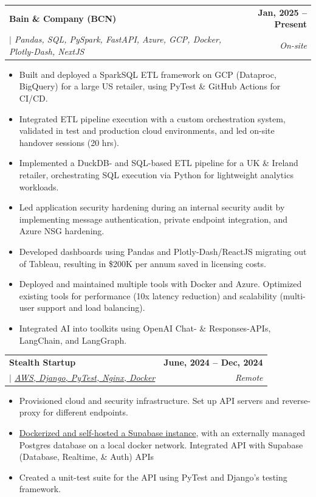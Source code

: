 \documentclass[letterpaper,11pt]{article}
\makeatletter
\newcommand{\uniformunderline}[1]{%
  \uline{\phantom{#1}}%
  \llap{\contour{white}{#1}}%
}
\newcommand{\resumeItem}[1]{
  \item\small{
    {#1 \vspace{-1pt}}
  }
}
\newcommand{\resumeSubheading}[4]{
  \vspace{-1pt}\item
    \begin{tabular*}{1.0\textwidth}[t]{l@{\extracolsep{\fill}}r}
      \textbf{\large#1} & \textbf{\small #2} \\
      \textit{\large#3} & \textit{\small #4} \\
      
    \end{tabular*}\vspace{-7pt}
}
\newcommand{\resumeItemListStart}{\begin{itemize}}
\newcommand{\resumeItemListEnd}{\end{itemize}\vspace{-5pt}}
\makeatother
\begin{document}
        \resumeSubheading
            {Bain \& Company (BCN)}{Jan, 2025 -- Present} 
            {\uniformunderline{Analyst} $|$ \textnormal{Pandas, SQL, PySpark, FastAPI, Azure, GCP, Docker, Plotly-Dash, NextJS } } {On-site}
            \resumeItemListStart
                \resumeItem{\normalsize{Built and deployed a SparkSQL ETL framework on GCP (Dataproc, BigQuery) for a large US retailer, \newline using PyTest \& GitHub Actions for CI/CD.}}
                \resumeItem{\normalsize{Integrated ETL pipeline execution with a custom orchestration system, validated in test and production cloud environments, and led on-site handover sessions (20 hrs).}}
                \resumeItem{\normalsize{Implemented a DuckDB- and SQL-based ETL pipeline for a UK \& Ireland retailer, orchestrating SQL execution via Python for lightweight analytics workloads.}}
                \resumeItem{\normalsize{Led application security hardening during an internal security audit by implementing message authentication, private endpoint integration, and Azure NSG hardening.}}
                \resumeItem{\normalsize{Developed dashboards using Pandas and Plotly-Dash/ReactJS migrating out of Tableau, resulting in \newline \$200K per annum saved in licensing costs.}}
                \resumeItem{\normalsize{Deployed and maintained multiple tools with Docker and Azure. Optimized existing tools for performance (10x latency reduction) and scalability (multi-user support and load balancing).}}
                \resumeItem{\normalsize{Integrated AI into toolkits using OpenAI Chat- \& Responses-APIs, LangChain, and LangGraph.}}
            \resumeItemListEnd

        \resumeSubheading
            {Stealth Startup}{June, 2024 -- Dec, 2024} 
            {\uniformunderline{DevOps \& Application Engineer} $|$ \textnormal{\href{https://github.com/saharshbhansali/supabase-decoupled-postgres}{AWS, Django, PyTest, Nginx, Docker \footnotesize{\raisebox{-0.05\height}\faExternalLink}}} }{Remote}
            \resumeItemListStart
                \resumeItem{\normalsize{Provisioned cloud and security infrastructure. Set up API servers and reverse-proxy for different endpoints.}}
                \resumeItem{\normalsize{\href{https://github.com/saharshbhansali/supabase-decoupled-postgres}{Dockerized and self-hosted a Supabase instance}, with an externally managed Postgres database on a local docker network. Integrated API with Supabase (Database, Realtime, \& Auth) APIs}} 
                \resumeItem{\normalsize{Created a unit-test suite for the API using PyTest and Django's testing framework.}}
            \resumeItemListEnd  
\end{document}
